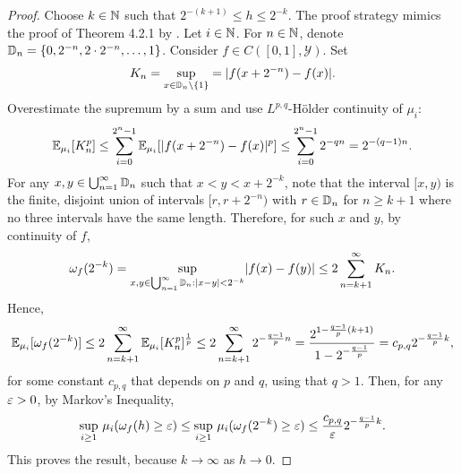\documentclass[12pt]{report}
\begin{document}
\begin{proof}
    Choose $k \in \mathbb{N}$ such that $2^{-(k + 1)} \le h \le 2^{-k}$.
    The proof strategy mimics the proof of Theorem 4.2.1 by \textcite{Norris:2018:Advanced_Probability}.
    Let $i \in \mathbb{N}$.
    For $n \in \mathbb{N}$, denote $\mathbb{D}_n = \{0, 2^{-n}, 2 \cdot 2^{-n}, \ldots, 1\}$.
    Consider $f \in C([0, 1], \mathcal{Y})$.
    Set
    \begin{equation}
        K_n = \operatorname*{sup}_{x \in \mathbb{D}_n \setminus \{1\}} = \lvert f(x + 2^{-n}) - f(x)\rvert.
    \end{equation}
    Overestimate the supremum by a sum and use $L^{p,q}$-H\"older continuity of $\mu_i$:
    \begin{equation}
         \mathbb{E}_{\mu_i}[K_n^p]
         \le \sum_{i=0}^{2^n - 1} \mathbb{E}_{\mu_i}[\lvert f(x + 2^{-n}) - f(x)\rvert^p]
         \le \sum_{i=0}^{2^n - 1} 2^{-q n}
         = 2^{-(q - 1) n}.
    \end{equation}
    For any $x, y \in \bigcup_{n=1}^\infty \mathbb{D}_n$ such that $x < y < x + 2^{-k}$, note that the interval $[x, y)$ is the finite, disjoint union of intervals $[r, r + 2^{-n})$ with $r \in \mathbb{D}_n$ for $n \ge k + 1$ where no three intervals have the same length.
    Therefore, for such $x$ and $y$, by continuity of $f$,
    \begin{equation}
        \omega_f(2^{-k})
        = \operatorname*{sup}_{x, y \in \bigcup_{n=1}^\infty \mathbb{D}_n: \lvert x - y\rvert< 2^{-k}}\lvert f(x) - f(y)\rvert
        \le 2\sum_{n=k+1}^\infty K_n.
    \end{equation}
    Hence,
    \begin{equation}
        \mathbb{E}_{\mu_i}[\omega_f(2^{-k})]
        \le 2\sum_{n=k+1}^\infty \mathbb{E}_{\mu_i}[K_n^p]^{\frac1p}
        \le 2\sum_{n=k+1}^\infty 2^{-\frac{q - 1}{p}n}
        = \frac{2^{1-\frac{q - 1}{p}(k + 1)}}{1 - 2^{-\frac{q - 1}{p}}}
        = c_{p,q} 2^{-\frac{q - 1}{p}k},
    \end{equation}
    for some constant $c_{p, q}$ that depends on $p$ and $q$, using that $q > 1$.
    Then, for any $\varepsilon > 0$, by Markov's Inequality,
    \begin{equation}
        \operatorname*{sup}_{i \ge 1}\, \mu_i(\omega_f(h) \ge \varepsilon)
        \le \operatorname*{sup}_{i \ge 1}\, \mu_i(\omega_f(2^{-k}) \ge \varepsilon)
        \le \frac{c_{p,q}}{\varepsilon} 2^{-\frac{q - 1}{p}k}.
    \end{equation}
    This proves the result, because $k \to \infty$ as $h \to 0$.
\end{proof}
\end{document}
